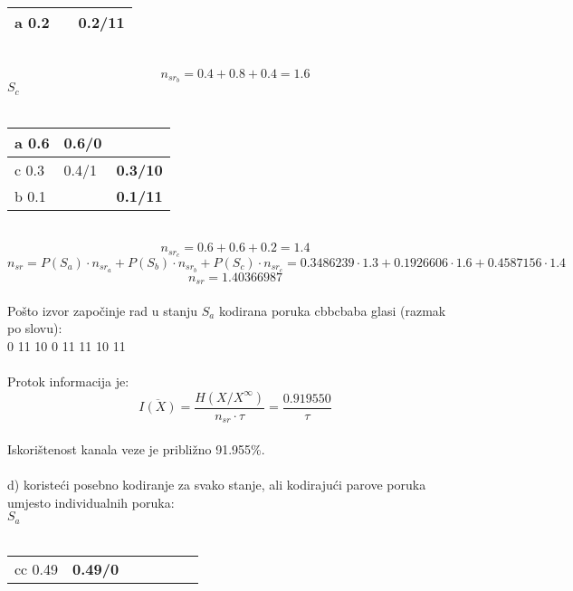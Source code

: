 \documentclass[12pt]{article}
\begin{document}
\begin{enumerate}
\begin{tabular}{|l|l|l}
a 0.2 &                & \multicolumn{1}{l|}{\textbf{0.2/11}} \\ \hline
\end{tabular}
\\
\begin{equation*}
    n_{sr_{b}} = 0.4 + 0.8 + 0.4 = 1.6
\end{equation*}
 $S_c$ \\
\\
\begin{tabular}{|l|l|l}
\cline{1-2}
a 0.6 & \textbf{0.6/0} &                                      \\ \hline
c 0.3 & 0.4/1          & \multicolumn{1}{l|}{\textbf{0.3/10}} \\ \cline{1-1} \cline{3-3} 
b 0.1 &                & \multicolumn{1}{l|}{\textbf{0.1/11}} \\ \hline
\end{tabular}
\\
\begin{equation*}
    n_{sr_{c}} = 0.6 + 0.6 + 0.2 = 1.4
\end{equation*}
 \begin{equation*}
     n_{sr} = P(S_a) \cdot n_{sr_{a}} + P(S_b) \cdot n_{sr_{b}} + P(S_c) \cdot n_{sr_{c}} = 0.3486239 \cdot 1.3 + 0.1926606 \cdot 1.6 + 0.4587156 \cdot 1.4
 \end{equation*}
 \begin{equation*}
     n_{sr} = 1.40366987
 \end{equation*} \\
  Pošto izvor započinje rad u stanju $S_a$ kodirana poruka cbbcbaba glasi (razmak po slovu):\\ 
  0 11 10 0 11 11 10 11 \\
  \\
  Protok informacija je:
 \begin{equation*}
    \overline{I(X)} = \frac{H(X/X^\infty)}{n_{sr} \cdot \tau} = \frac{0.919550}{\tau}
\end{equation*}
\\
Iskorištenost kanala veze je približno 91.955\%.
\\
\\
d) koristeći posebno kodiranje za svako stanje, ali kodirajući parove poruka umjesto individualnih poruka:
\\
$S_a$
\\	
\\
\begin{tabular}{|l|l|lllll}
\cline{1-2}
cc 0.49 & \textbf{0.49/0} &                              &                                        &                                         &                                          &                                           \\ \cline{1-4}

\end{tabular}
\end{enumerate}
\end{document}
